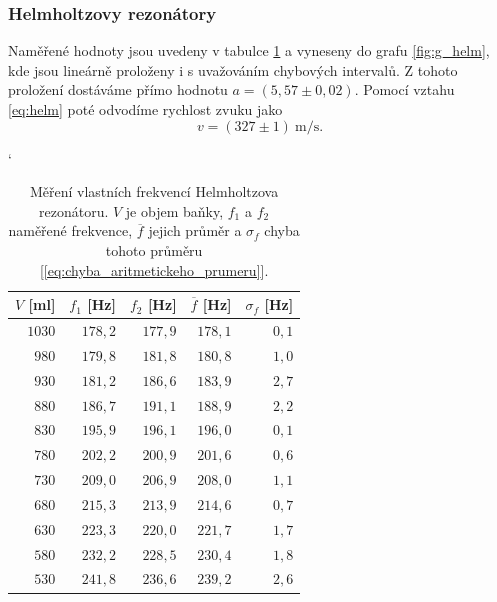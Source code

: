 \documentclass[english]{article}
\newcommand{\unit}[1]{\mathrm{#1}}
\begin{document}
	\subsubsection{Helmholtzovy rezonátory}
	Naměřené hodnoty jsou uvedeny v tabulce \ref{tab:helm} a vyneseny do grafu \ref{fig:g_helm}, kde jsou lineárně proloženy i s uvažováním chybových intervalů. Z tohoto proložení dostáváme přímo hodnotu $a = (5,57 \pm 0,02)$. Pomocí vztahu \ref{eq:helm} poté odvodíme rychlost zvuku jako
			\begin{equation}
			v = (327 \pm 1)\ \unit{m/s}.
			\label{eq:helm_vysledky}
			\end{equation}	 
		
		\begin{table}[h]
		\catcode` %
		\begin{center}
		\begin{tabular}{|r|r|r|r|r|}
		\hline
			$V$ [ml]  &  $f_1$ [Hz]  &  $f_2$ [Hz]  &  $\overline{f}$ [Hz]  &  $\sigma_f$ [Hz]   \\\hline
		    $1030$  &  $178,2$  &  $177,9$  &  $178,1$  &  $0,1$   \\\hline
		    $980$  &  $179,8$  &  $181,8$  &  $180,8$  &  $1,0$   \\\hline
		    $930$  &  $181,2$  &  $186,6$  &  $183,9$  &  $2,7$   \\\hline
		    $880$  &  $186,7$  &  $191,1$  &  $188,9$  &  $2,2$   \\\hline
		    $830$  &  $195,9$  &  $196,1$  &  $196,0$  &  $0,1$   \\\hline
		    $780$  &  $202,2$  &  $200,9$  &  $201,6$  &  $0,6$   \\\hline
		    $730$  &  $209,0$  &  $206,9$  &  $208,0$  &  $1,1$   \\\hline
		    $680$  &  $215,3$  &  $213,9$  &  $214,6$  &  $0,7$   \\\hline
		    $630$  &  $223,3$  &  $220,0$  &  $221,7$  &  $1,7$   \\\hline
		    $580$  &  $232,2$  &  $228,5$  &  $230,4$  &  $1,8$   \\\hline
		    $530$  &  $241,8$  &  $236,6$  &  $239,2$  &  $2,6$   \\\hline
		\end{tabular}
		\caption{Měření vlastních frekvencí Helmholtzova rezonátoru. $V$ je objem baňky, $f_1$ a $f_2$ naměřené frekvence, $\overline{f}$ jejich průměr a $\sigma_f$ chyba tohoto průměru [\ref{eq:chyba_aritmetickeho_prumeru}].}
		\label{tab:helm}
		\end{center}
		\end{table}
				
\end{document}
